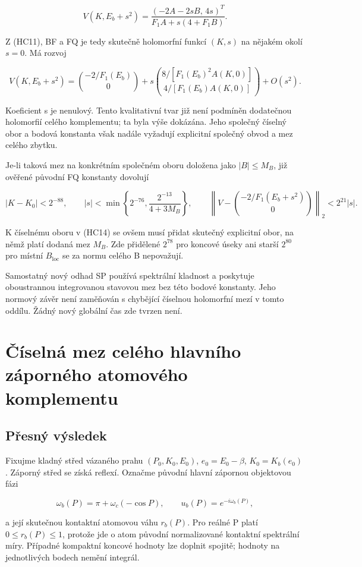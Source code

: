 \documentclass[11pt,a4paper]{article}
\theoremstyle{remark}\newtheorem{remark}[theorem]{Poznámka}
\numberwithin{equation}{section}
\begin{document}
\[
V(K,E_b+s^2)=
\frac{(-2A-2sB,\,4s)^T}{F_1A+s(4+F_1B)}.
\tag{HC12}
\]

Z (HC11), BF a FQ je tedy skutečně holomorfní funkcí \((K,s)\) na
nějakém okolí \(s=0\). Má rozvoj

\[
V(K,E_b+s^2)=\binom{-2/F_1(E_b)}0
+s\binom{8/[F_1(E_b)^2 A(K,0)]}{4/[F_1(E_b)A(K,0)]}
+O(s^2).
\tag{HC13}
\]

Koeficient s je nenulový. Tento kvalitativní tvar již není podmíněn
dodatečnou holomorfií celého komplementu; ta byla výše dokázána. Jeho
společný číselný obor a bodová konstanta však nadále vyžadují explicitní
společný obvod a mez celého zbytku.

Je-li taková mez na konkrétním společném oboru doložena jako
\(|B|\le M_B\), již ověřené původní FQ konstanty dovolují

\[
|K-K_0|<2^{-88},\qquad
|s|<\min\left\{2^{-76},\frac{2^{-13}}{4+3M_B}\right\},
\qquad
\left\|V-\binom{-2/F_1(E_b+s^2)}0\right\|_2<2^{21}|s|.
\tag{HC14}
\]

K číselnému oboru v (HC14) se ovšem musí přidat skutečný explicitní
obor, na němž platí dodaná mez \(M_B\). Zde přidělené \(2^{78}\) pro
koncové úseky ani starší \(2^{80}\) pro místní \(B_{\mathrm{loc}}\) se
za normu celého B nepovažují.

Samostatný nový odhad SP používá spektrální kladnost a poskytuje
oboustrannou integrovanou stavovou mez bez této bodové konstanty. Jeho
normový závěr není zaměňován s chybějící číselnou holomorfní mezí v
tomto oddílu. Žádný nový globální čas zde tvrzen není.

\clearpage
\section{Číselná mez celého hlavního záporného atomového komplementu}
\hypertarget{pux159esnuxfd-vuxfdsledek}{%
\subsection{Přesný výsledek}\label{pux159esnuxfd-vuxfdsledek}}

Fixujme kladný střed vázaného prahu \((P_0,K_0,E_0)\),
\(e_0=E_0-\beta\), \(K_0=K_b(e_0)\). Záporný střed se získá reflexí.
Označme původní hlavní zápornou objektovou fázi

\[
\omega_b(P)=\pi+\omega_c(-\cos P),\qquad
u_b(P)=e^{-i\omega_b(P)},
\tag{AM1}
\]

a její skutečnou kontaktní atomovou váhu \(r_b(P)\). Pro reálné P platí
\(0\le r_b(P)\le1\), protože jde o atom původní normalizované kontaktní
spektrální míry. Případné kompaktní koncové hodnoty lze doplnit spojitě;
hodnoty na jednotlivých bodech nemění integrál.
\end{document}
